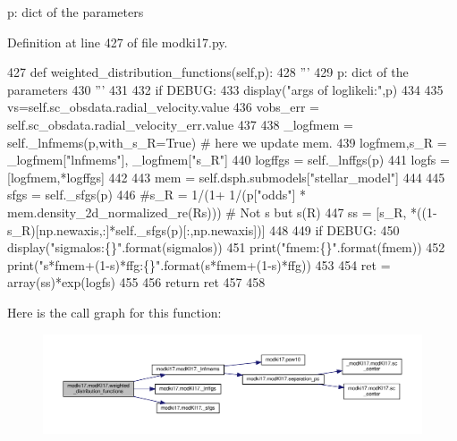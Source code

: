 \begin{DoxyVerb}p: dict of the parameters
\end{DoxyVerb}
 

Definition at line 427 of file modki17.\+py.


\begin{DoxyCode}
427     \textcolor{keyword}{def }weighted\_distribution\_functions(self,p):
428         \textcolor{stringliteral}{'''}
429 \textcolor{stringliteral}{        p: dict of the parameters}
430 \textcolor{stringliteral}{        '''}
431         
432         \textcolor{keywordflow}{if} DEBUG:
433             display(\textcolor{stringliteral}{"args of loglikeli:"},p)
434         
435         vs=self.sc\_obsdata.radial\_velocity.value        
436         vobs\_err = self.sc\_obsdata.radial\_velocity\_err.value
437         
438         \_logfmem = self.\_lnfmems(p,with\_s\_R=\textcolor{keyword}{True}) \textcolor{comment}{# here we update mem.}
439         logfmem,s\_R = \_logfmem[\textcolor{stringliteral}{"lnfmems"}], \_logfmem[\textcolor{stringliteral}{"s\_R"}]
440         logffgs = self.\_lnffgs(p)
441         logfs = [logfmem,*logffgs]
442         
443         mem = self.dsph.submodels[\textcolor{stringliteral}{"stellar\_model"}]
444         
445         sfgs = self.\_sfgs(p)
446         \textcolor{comment}{#s\_R = 1/(1+ 1/(p["odds"] * mem.density\_2d\_normalized\_re(Rs))) # Not s but s(R)}
447         ss = [s\_R, *((1-s\_R)[np.newaxis,:]*self.\_sfgs(p)[:,np.newaxis])]
448         
449         \textcolor{keywordflow}{if} DEBUG:
450             display(\textcolor{stringliteral}{"sigmalos:\{\}"}.format(sigmalos))
451             print(\textcolor{stringliteral}{"fmem:\{\}"}.format(fmem))
452             print(\textcolor{stringliteral}{"s*fmem+(1-s)*ffg:\{\}"}.format(s*fmem+(1-s)*ffg))
453         
454         ret = array(ss)*exp(logfs)
455         
456         \textcolor{keywordflow}{return} ret
457     
458     
\end{DoxyCode}
Here is the call graph for this function\+:\nopagebreak
\begin{figure}[H]
\begin{center}
\leavevmode
\includegraphics[width=350pt]{df/da3/classmodki17_1_1modKI17_abab55a25d43afbd5737246fd8da155f7_cgraph}
\end{center}
\end{figure}
